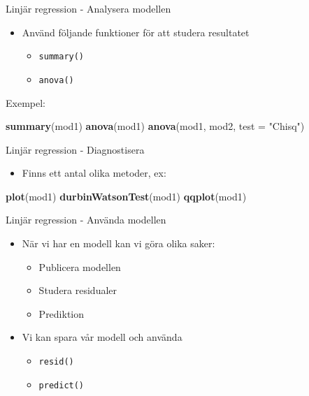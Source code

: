 \documentclass[
  11pt,
  ignorenonframetext,
  handout]{beamer}
\newenvironment{Shaded}{\begin{snugshade}}{\end{snugshade}}
\newcommand{\AttributeTok}[1]{\textcolor[rgb]{0.13,0.29,0.53}{#1}}
\newcommand{\FunctionTok}[1]{\textcolor[rgb]{0.13,0.29,0.53}{\textbf{#1}}}
\newcommand{\NormalTok}[1]{#1}
\newcommand{\StringTok}[1]{\textcolor[rgb]{0.31,0.60,0.02}{#1}}
\providecommand{\tightlist}{%
  \setlength{\itemsep}{0pt}\setlength{\parskip}{0pt}}
\begin{document}
\begin{frame}[fragile]{Linjär regression - Analysera modellen}
\protect{}\label{linjuxe4r-regression---analysera-modellen}
\begin{itemize}
\tightlist
\item
  Använd följande funktioner för att studera resultatet

  \begin{itemize}
  \tightlist
  \item
    \texttt{summary()}
  \item
    \texttt{anova()}
  \end{itemize}
\end{itemize}

Exempel:

\begin{Shaded}
\begin{Highlighting}[]
\FunctionTok{summary}\NormalTok{(mod1)}
\FunctionTok{anova}\NormalTok{(mod1)}
\FunctionTok{anova}\NormalTok{(mod1, mod2, }\AttributeTok{test =} \StringTok{"Chisq"}\NormalTok{)}
\end{Highlighting}
\end{Shaded}
\end{frame}

\begin{frame}[fragile]{Linjär regression - Diagnostisera}
\protect{}\label{linjuxe4r-regression---diagnostisera}
\begin{itemize}
\tightlist
\item
  Finns ett antal olika metoder, ex:
\end{itemize}

\begin{Shaded}
\begin{Highlighting}[]
\FunctionTok{plot}\NormalTok{(mod1)}
\FunctionTok{durbinWatsonTest}\NormalTok{(mod1)}
\FunctionTok{qqplot}\NormalTok{(mod1)}
\end{Highlighting}
\end{Shaded}
\end{frame}

\begin{frame}{Linjär regression - Använda modellen}
\protect{}\label{linjuxe4r-regression---anvuxe4nda-modellen}
\begin{itemize}
\tightlist
\item
  När vi har en modell kan vi göra olika saker:

  \begin{itemize}
  \tightlist
  \item
    Publicera modellen
  \item
    Studera residualer
  \item
    Prediktion
  \end{itemize}
\item
  Vi kan spara vår modell och använda

  \begin{itemize}
  \tightlist
  \item
    \texttt{resid()}
  \item
    \texttt{predict()}
  \end{itemize}
\end{itemize}
\end{frame}
\end{document}

